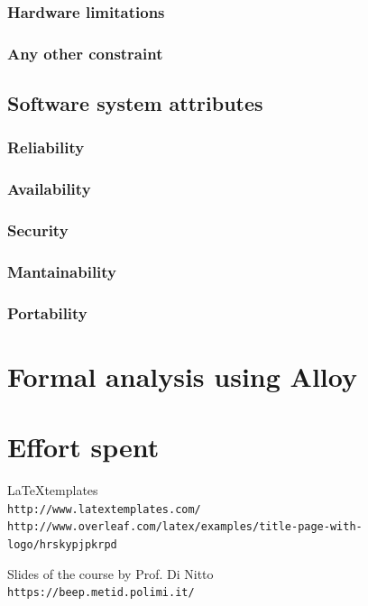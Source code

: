 \documentclass[12pt]{article}
\begin{document}
    \subsubsection{Hardware limitations}
    \subsubsection{Any other constraint}
  \subsection{Software system attributes}
    \subsubsection{Reliability}
    \subsubsection{Availability}
    \subsubsection{Security}
    \subsubsection{Mantainability}
    \subsubsection{Portability}

\clearpage
\section{Formal analysis using Alloy}
\label{sec:alloy}

\clearpage
\section{Effort spent}
\label{sec:effort}

\clearpage
\begin{thebibliography}{9}

  \LaTeX templates
  \\\texttt{http://www.latextemplates.com/}
  \\\texttt
  {http://www.overleaf.com/latex/examples/title-page-with-logo/hrskypjpkrpd}

  Slides of the course by Prof. Di Nitto
  \\\texttt{https://beep.metid.polimi.it/}


\end{thebibliography}
\end{document}
